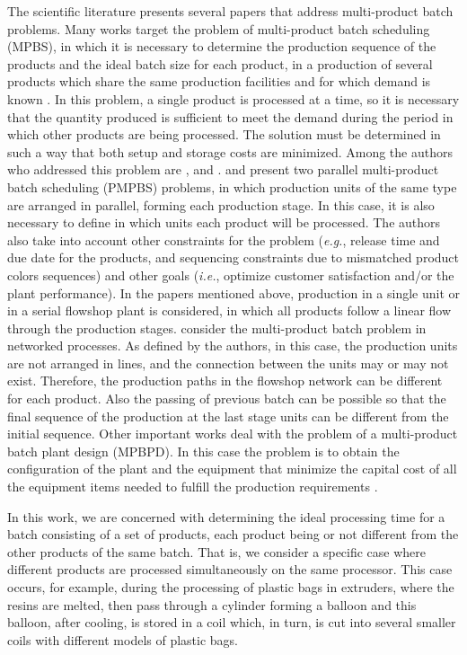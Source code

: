 \documentclass[authoryear,preprint,12pt]{elsarticle}
\begin{document}
The scientific literature presents several papers that address multi-product batch problems. Many works target the problem of multi-product batch scheduling (MPBS), in which it is necessary to determine the production sequence of the products and the ideal batch size for each product, in a production of several products which share the same production facilities and for which demand is known \citep{Eilon1985}. In this problem, a single product is processed at a time, so it is necessary that the quantity produced is sufficient to meet the demand during the period in which other products are being processed. The solution must be determined in such a way that both setup and storage costs are minimized. Among the authors who addressed this problem are \cite{Eilon1985}, \cite{Omega1993} and \cite{LiuEtAl2020}. \cite{MendezEtAll2000} and \cite{ShiEtAll2017} present two parallel multi-product batch scheduling (PMPBS) problems, in which production units of the same type are arranged in parallel, forming each production stage. In this case, it is also necessary to define in which units each product will be processed. The authors also take into account other constraints for the problem (\emph{e.g.}, release time and due date for the products, and sequencing constraints due to mismatched product colors sequences) and other goals (\emph{i.e.}, optimize customer satisfaction and/or the plant performance). In the papers mentioned above, production in a single unit or in a serial flowshop plant is considered, in which all products follow a linear flow through the production stages. \cite{KimEtAl1996} consider the multi-product batch problem in networked processes. As defined by the authors, in this case, the production units are not arranged in lines, and the connection between the units may or may not exist. Therefore, the production paths in the flowshop network can be different for each product. Also the passing of previous batch can be possible so that the final sequence of the production at the last stage units can be different from the initial sequence. Other important works deal with the problem of a multi-product batch plant design (MPBPD). In this case the problem is to obtain the configuration of the plant and the equipment that minimize the capital cost of all the equipment items needed to fulfill the production requirements \citep{RavemarkAndRippin1998}. 

In this work, we are concerned with determining the ideal processing time for a batch consisting of a set of products, each product being or not different from the other products of the same batch. That is, we consider a specific case where different products are processed simultaneously on the same processor. This case occurs, for example, during the processing of plastic bags in extruders, where the resins are melted, then pass through a cylinder forming a balloon and this balloon, after cooling, is stored in a coil which, in turn, is cut into several smaller coils with different models of plastic bags.
\end{document}

